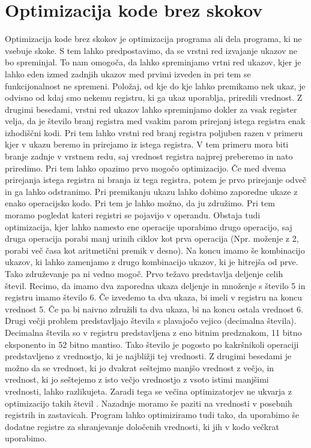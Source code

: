 \documentclass[a4paper, 12pt]{book}
\begin{document}
\section{Optimizacija kode brez skokov}
\label{fl}
Optimizacija kode brez skokov je optimizacija programa ali dela programa, ki ne vsebuje skoke. S tem lahko predpostavimo, da se vrstni red izvajanje ukazov ne bo spreminjal. To nam omogoča, da lahko spreminjamo vrtni red ukazov, kjer je lahko eden izmed zadnjih ukazov med prvimi izveden in pri tem se funkcijonalnost ne spremeni. Položaj, od kje do kje lahko premikamo nek ukaz, je odvisno od kdaj smo nekemu registru, ki ga ukaz uporablja, priredili vrednost. Z drugimi besedami, vrstni red ukazov lahko spreminjamo dokler za vsak register velja, da je število branj registra med vsakim parom prirejanj istega registra enak izhodiščni kodi. Pri tem lahko vrstni red branj registra poljuben razen v primeru kjer v ukazu beremo in prirejamo iz istega registra. V tem primeru mora biti branje zadnje v vrstnem redu, saj vrednost registra najprej preberemo in nato priredimo. Pri tem lahko opazimo prvo mogočo optimizacijo. Če med dvema prirejanja istega registra ni branja iz tega registra, potem je prvo prirejanje odveč in ga lahko odstranimo. Pri premikanju ukazu lahko dobimo zaporedne ukaze z enako operacijsko kodo. Pri tem je lahko možno, da ju združimo. Pri tem moramo pogledat kateri registri se pojavijo v operandu. Obstaja tudi optimizacija, kjer lahko namesto ene operacije uporabimo drugo operacijo, saj druga operacija porabi manj urinih ciklov kot prva operacija (Npr. moženje z 2, porabi več časa kot aritmetični premik v desno). Na koncu imamo še kombinacijo ukazov, ki lahko zamenjamo z drugo kombinacijo ukazov, ki je hitrejša od prve. Tako združevanje pa ni vedno mogoč. Prvo težavo predstavlja deljenje celih števil. Recimo, da imamo dva zaporedna ukaza deljenje in množenje s število 5 in registru imamo število 6. Če izvedemo ta dva ukaza, bi imeli v registru na koncu vrednost 5. Če pa bi naivno združili ta dva ukaza, bi na koncu ostala vrednost 6. Drugi večji problem predstavljajo števila s plavajočo vejico (decimalna števila). Decimalna števila so v registru predstavljena z eno bitnim predznakom, 11 bitno eksponento in 52 bitno mantiso. Tako število je pogosto po kakršnikoli operaciji predstavljeno z vrednostjo, ki je najbližji tej vrednosti. Z drugimi besedami je možno da se vrednost, ki jo dvakrat seštejmo manjšo vrednost z večjo, in vrednost, ki jo seštejemo z isto večjo vrednostjo z vsoto istimi manjšimi vrednosti, lahko razlikujeta. Zaradi tega se večina optimizatorjev ne ukvarja z optimizacijo takih števil \cite{float2}. Nazadnje moramo še paziti na vrednosti v posebnih registrih in zastavicah. Program lahko optimiziramo tudi tako, da uporabimo še dodatne registre za shranjevanje določenih vrednosti, ki jih v kodo večkrat uporabimo.
\end{document}
